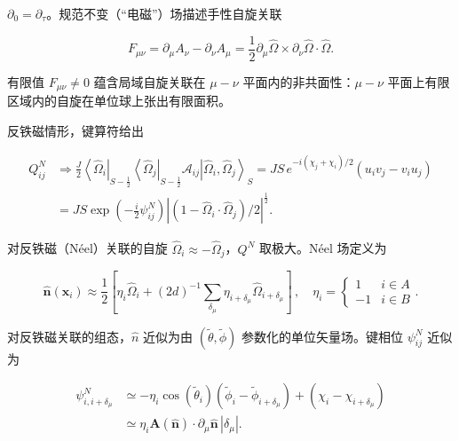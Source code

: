 $\partial_{0} = \partial_{\tau}$。规范不变（“电磁”）场描述手性自旋关联

\begin{equation*}
F _ {\mu \nu} = \partial_ {\mu} A _ {\nu} - \partial_ {\nu} A _ {\mu} = \frac {1}{2} \partial_ {\mu} \hat {\Omega} \times \partial_ {\nu} \hat {\Omega} \cdot \hat {\Omega}.
\tag{17.7}
\end{equation*}

有限值 $F_{\mu\nu} \neq 0$ 蕴含局域自旋关联在 $\mu - \nu$ 平面内的非共面性：$\mu - \nu$ 平面上有限区域内的自旋在单位球上张出有限面积。

反铁磁情形，键算符给出

\begin{align*}
Q _ {ij} ^ {N} & \Rightarrow \frac {J}{2} \left\langle \hat {\Omega} _ {i} \right|_{S - \frac {1}{2}} \left\langle \hat {\Omega} _ {j} \right|_{S - \frac {1}{2}} \mathcal {A} _ {ij} \left| \hat {\Omega} _ {i}, \hat {\Omega} _ {j} \right\rangle_{S} = J S \, e ^ {- i ( \chi_ {j} + \chi_ {i} )/2} \left( u _ {i} v _ {j} - v _ {i} u _ {j} \right)\\
& = J S \exp \left( - \frac {i}{2} \psi_{ij} ^ {N} \right) \left| ( 1 - \hat {\Omega} _ {i} \cdot \hat {\Omega} _ {j} )/2 \right| ^ {\frac {1}{2}} .
\tag{17.8}
\end{align*}

对反铁磁（Néel）关联的自旋 $\hat{\Omega}_{i} \approx -\hat{\Omega}_{j}$，$Q^{N}$ 取极大。Néel 场定义为

\begin{equation*}
\hat {\mathbf {n}} ( \mathbf {x} _ {i} ) \approx \frac {1}{2} \left[ \eta_ {i} \hat {\Omega} _ {i} + ( 2 d ) ^ {- 1} \sum_{\delta_ {\mu}} \eta_{i + \delta_ {\mu}} \hat {\Omega}_{i + \delta_ {\mu}} \right] \, , \quad \eta_ {i} = \left\{ \begin{array}{ll} 1 & i \in A \\ - 1 & i \in B \end{array} \right. .
\tag{17.9}
\end{equation*}

对反铁磁关联的组态，$\hat{n}$ 近似为由 $(\tilde{\theta},\tilde{\phi})$ 参数化的单位矢量场。键相位 $\psi_{ij}^{N}$ 近似为

\begin{align*}
\psi_{i, i + \delta_ {\mu}} ^ {N} & \simeq - \eta_ {i} \cos ( \tilde {\theta} _ {i} ) \left( \tilde {\phi} _ {i} - \tilde {\phi}_{i + \delta_ {\mu}} \right) + \left( \chi_ {i} - \chi_{i + \delta_ {\mu}} \right)\\
& \simeq \eta_ {i} \mathbf {A} ( \hat {\mathbf {n}} ) \cdot \partial_ {\mu} \hat {\mathbf {n}} \, | \delta_ {\mu} | .
\tag{17.10}
\end{align*}

